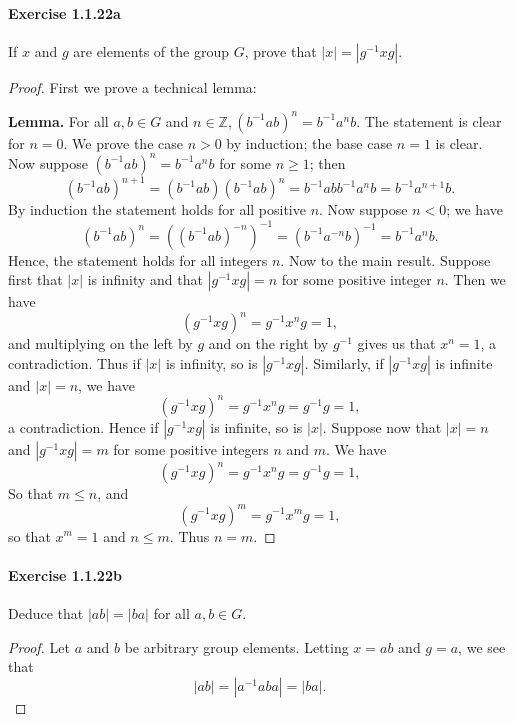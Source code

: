 \documentclass{article}
\theoremstyle{definition}
\begin{document}
\paragraph{Exercise 1.1.22a} If $x$ and $g$ are elements of the group $G$, prove that $|x|=\left|g^{-1} x g\right|$.
\begin{proof}
    First we prove a technical lemma:

    {\bf Lemma.} For all $a, b \in G$ and $n \in \mathbb{Z},\left(b^{-1} a b\right)^n=b^{-1} a^n b$.
The statement is clear for $n=0$. We prove the case $n>0$ by induction; the base case $n=1$ is clear. Now suppose $\left(b^{-1} a b\right)^n=b^{-1} a^n b$ for some $n \geq 1$; then
$$
\left(b^{-1} a b\right)^{n+1}=\left(b^{-1} a b\right)\left(b^{-1} a b\right)^n=b^{-1} a b b^{-1} a^n b=b^{-1} a^{n+1} b .
$$
By induction the statement holds for all positive $n$.
Now suppose $n<0$; we have
$$
\left(b^{-1} a b\right)^n=\left(\left(b^{-1} a b\right)^{-n}\right)^{-1}=\left(b^{-1} a^{-n} b\right)^{-1}=b^{-1} a^n b .
$$
Hence, the statement holds for all integers $n$.
Now to the main result. Suppose first that $|x|$ is infinity and that $\left|g^{-1} x g\right|=n$ for some positive integer $n$. Then we have
$$
\left(g^{-1} x g\right)^n=g^{-1} x^n g=1,
$$
and multiplying on the left by $g$ and on the right by $g^{-1}$ gives us that $x^n=1$, a contradiction. Thus if $|x|$ is infinity, so is $\left|g^{-1} x g\right|$. Similarly, if $\left|g^{-1} x g\right|$ is infinite and $|x|=n$, we have
$$
\left(g^{-1} x g\right)^n=g^{-1} x^n g=g^{-1} g=1,
$$
a contradiction. Hence if $\left|g^{-1} x g\right|$ is infinite, so is $|x|$.
Suppose now that $|x|=n$ and $\left|g^{-1} x g\right|=m$ for some positive integers $n$ and $m$. We have
$$
\left(g^{-1} x g\right)^n=g^{-1} x^n g=g^{-1} g=1,
$$
So that $m \leq n$, and
$$
\left(g^{-1} x g\right)^m=g^{-1} x^m g=1,
$$
so that $x^m=1$ and $n \leq m$. Thus $n=m$.
\end{proof}



\paragraph{Exercise 1.1.22b} Deduce that $|a b|=|b a|$ for all $a, b \in G$.
\begin{proof}
    Let $a$ and $b$ be arbitrary group elements. Letting $x=a b$ and $g=a$, we see that
$$
|a b|=\left|a^{-1} a b a\right|=|b a| .
$$
\end{proof}
\end{document}
